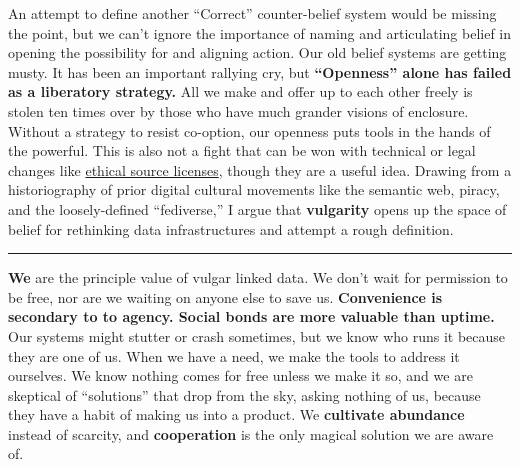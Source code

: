 An attempt to define another ``Correct'' counter-belief system would be
missing the point, but we can't ignore the importance of naming and
articulating belief in opening the possibility for and aligning
action. Our old
belief systems are getting musty. It has been an important rallying cry,
but \textbf{``Openness'' alone has failed as a liberatory strategy.} All
we make and offer up to each other freely is stolen ten times over by
those who have much grander visions of enclosure. Without a strategy to
resist co-option, our openness puts tools in the hands of the powerful.
This is also not a fight that can be won with technical or legal changes
like \href{https://ethicalsource.dev/licenses/}{ethical source
licenses}, though they are a useful idea. Drawing from a historiography
of prior digital cultural movements like the semantic web, piracy, and
the loosely-defined ``fediverse,'' I argue that
\textbf{vulgarity} opens up the space of belief for rethinking data
infrastructures and attempt a rough definition.

\begin{center}\rule{0.5\linewidth}{0.5pt}\end{center}

\textbf{We} are the principle value of vulgar linked data. We don't wait
for permission to be free, nor are we waiting on anyone else to save us.
\textbf{Convenience is secondary to to agency. Social bonds are more
valuable than uptime.} Our systems might stutter or crash sometimes, but
we know who runs it because they are one of us. When we have a need, we
make the tools to address it ourselves. We know nothing comes for free
unless we make it so, and we are skeptical of ``solutions'' that drop
from the sky, asking nothing of us, because they have a habit of making
us into a product. We \textbf{cultivate abundance} instead of scarcity,
and \textbf{cooperation} is the only magical solution we are aware of.

